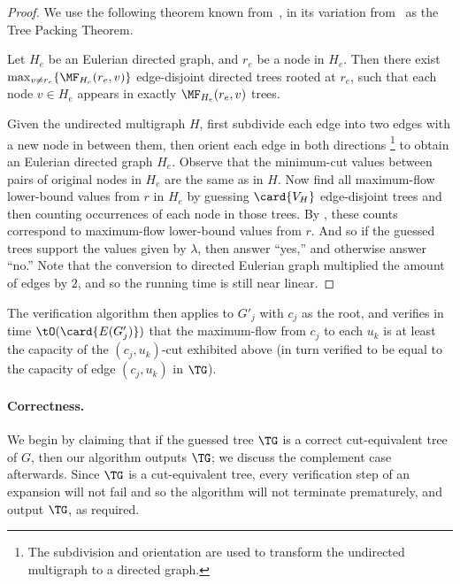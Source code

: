 \begin{proof}
We use the following theorem known from~\cite[Theorem $2.7$]{Bang-Jensen95},
in its variation from~\cite{Cole03} as the Tree Packing Theorem.

\begin{theorem}\label{theorem:BHKP}
Let $H_e$ be an Eulerian directed graph, and $r_e$ be a node in $H_e$.
Then there exist $\max_{v\neq r_e}\{\MF_{H_e}(r_e,v)\}$ edge-disjoint directed trees rooted at $r_e$, such that each node $v\in H_e$ appears in exactly $\MF_{H_e}(r_e,v)$ trees.
\end{theorem}

Given the undirected multigraph $H$, first subdivide each edge into two edges with a new node in between them,
then orient each edge in both directions%
\footnote{The subdivision and orientation are used to transform
  the undirected multigraph to a directed graph.
}
to obtain an Eulerian directed graph $H_e$.
Observe that the minimum-cut values between pairs of original nodes in $H_e$ are the same as in $H$.
%
Now find all maximum-flow lower-bound values from $r$
in $H_e$ by guessing $\card{V_H}$ edge-disjoint trees and then counting occurrences of each node in those trees. By , these counts correspond to maximum-flow lower-bound values from $r$. And so if the guessed trees support the values given by $\lambda$, then answer ``yes,'' and otherwise answer ``no.'' Note that the conversion to directed Eulerian graph multiplied the amount of edges by $2$, and so the running time is still near linear.
\end{proof}


The verification algorithm then applies 
to $G'_j$ with $c_j$ as the root, and verifies in time $\tO(\card{E(G'_j)})$
that the maximum-flow from $c_j$ to each $u_k$
is at least the capacity of the $(c_j,u_k)$-cut exhibited above
(in turn verified to be equal to the capacity of edge $(c_j, u_k)$ in $\TG$).


\paragraph{Correctness.}

We begin by claiming that if the guessed tree $\TG$ is a correct cut-equivalent tree of $G$, then our algorithm outputs $\TG$; we discuss the complement case afterwards.
Since $\TG$ is a cut-equivalent tree, every verification step of an expansion will not fail and so the algorithm will not terminate prematurely, and output $\TG$, as required.


